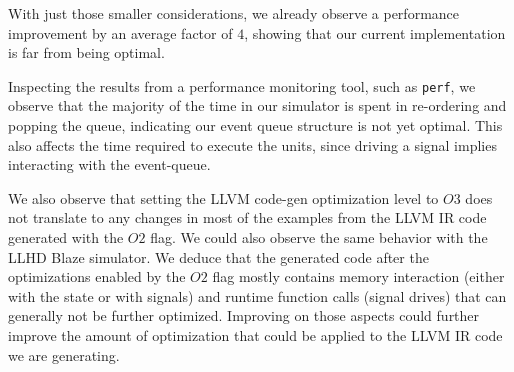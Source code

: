 With just those smaller considerations, we already observe a performance improvement by an average factor of $4$, showing that our current implementation is far from being optimal.

Inspecting the results from a performance monitoring tool, such as \texttt{perf}, we observe that the majority of the time in our simulator is spent in re-ordering and popping the queue, indicating our event queue structure is not yet optimal. This also affects the time required to execute the units, since driving a signal implies interacting with the event-queue.

We also observe that setting the LLVM code-gen optimization level to $O3$ does not translate to any changes in most of the examples from the LLVM IR code generated with the $O2$ flag. We could also observe the same behavior with the LLHD Blaze simulator. We deduce that the generated code after the optimizations enabled by the $O2$ flag mostly contains memory interaction (either with the state or with signals) and runtime function calls (signal drives) that can generally not be further optimized. Improving on those aspects could further improve the amount of optimization that could be applied to the LLVM IR code we are generating.